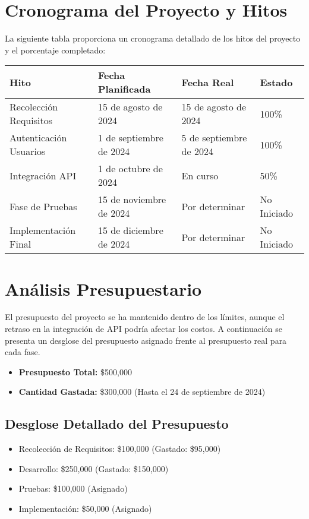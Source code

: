 \documentclass[12pt]{article}
\begin{document}
\section{Cronograma del Proyecto y Hitos}
La siguiente tabla proporciona un cronograma detallado de los hitos del proyecto y el porcentaje completado:

\begin{center}
\begin{table}[h]
\small
\begin{tabular}{|m{4cm}|m{4cm}|m{4cm}|m{2cm}|}
\hline
\textbf{Hito} & \textbf{Fecha Planificada} & \textbf{Fecha Real} & \textbf{Estado} \\
\hline
Recolección Requisitos & 15 de agosto de 2024 & 15 de agosto de 2024 & 100\% \\
\hline
Autenticación Usuarios & 1 de septiembre de 2024 & 5 de septiembre de 2024 & 100\% \\
\hline
Integración API & 1 de octubre de 2024 & En curso & 50\% \\
\hline
Fase de Pruebas & 15 de noviembre de 2024 & Por determinar & No Iniciado \\
\hline
Implementación Final & 15 de diciembre de 2024 & Por determinar & No Iniciado \\
\hline
\end{tabular}
\end{table}
\end{center}

\section{Análisis Presupuestario}
El presupuesto del proyecto se ha mantenido dentro de los límites, aunque el retraso en la integración de API podría afectar los costos. A continuación se presenta un desglose del presupuesto asignado frente al presupuesto real para cada fase.

\begin{itemize}
    \item \textbf{Presupuesto Total:} \$500,000
    \item \textbf{Cantidad Gastada:} \$300,000 (Hasta el 24 de septiembre de 2024)
\end{itemize}

\subsection*{Desglose Detallado del Presupuesto}
\begin{itemize}
    \item Recolección de Requisitos: \$100,000 (Gastado: \$95,000)
    \item Desarrollo: \$250,000 (Gastado: \$150,000)
    \item Pruebas: \$100,000 (Asignado)
    \item Implementación: \$50,000 (Asignado)
\end{itemize}
\end{document}
